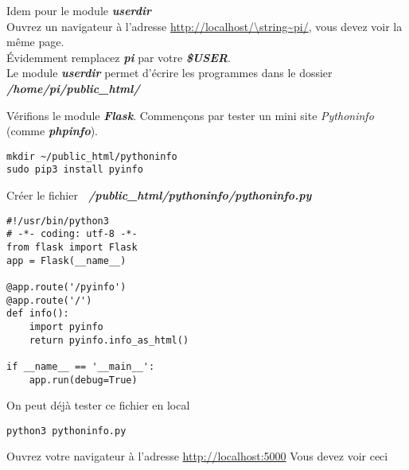 \documentclass[a4paper,10pt,usenames]{article}
\begin{document}
\begin{list}{}{}
\begin{center}
\end{center}
\normalsize 

\item Idem pour le module \textit{\textbf{userdir}}\\
	Ouvrez un navigateur à l'adresse \url{http://localhost/\string~pi/}, vous devez voir la même page.\\
Évidemment remplacez \textbf{\textit{pi}} par votre \textbf{\textit{\$USER}}.\\
	Le module \textit{\textbf{userdir}}  permet d'écrire les programmes dans le dossier \textbf{\textit{/home/pi/public\string_html/}}
\item Vérifions le module  \textit{\textbf{Flask}}. Commençons par tester un mini site \textit{Pythoninfo}  (comme \textbf{\textit{phpinfo}}).

\begin{lstlisting}
mkdir ~/public_html/pythoninfo
sudo pip3 install pyinfo
\end{lstlisting}


Créer le fichier \textit{\textbf{\string~/public\string_html/pythoninfo/pythoninfo.py}}

\begin{lstlisting}
#!/usr/bin/python3
# -*- coding: utf-8 -*-
from flask import Flask
app = Flask(__name__)

@app.route('/pyinfo')
@app.route('/')
def info():
    import pyinfo
    return pyinfo.info_as_html()

if __name__ == '__main__':
    app.run(debug=True)
\end{lstlisting}

On peut déjà tester ce fichier en local

\begin{lstlisting}
python3 pythoninfo.py
\end{lstlisting}

Ouvrez votre navigateur à l'adresse \url{http://localhost:5000} Vous devez voir ceci

 
\footnotesize
\begin{center}
	\fbox{\begin{minipage}[t]{12cm}


\end{minipage}}
\end{center}
\end{list}
\end{document}
